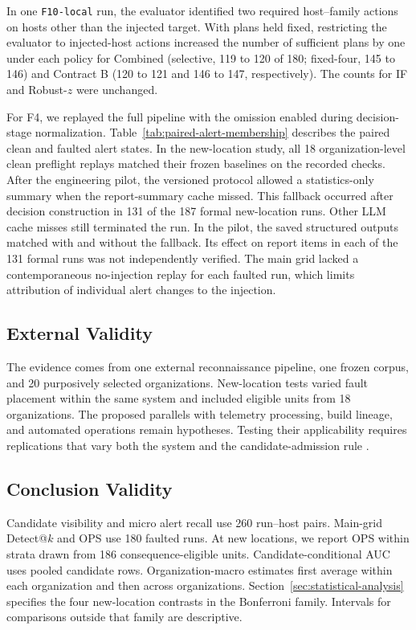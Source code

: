 \documentclass[sn-basic]{sn-jnl}%
\theoremstyle{thmstyleone}%
\theoremstyle{thmstyletwo}%
\theoremstyle{thmstylethree}%
\begin{document}
In one \texttt{F10-local} run, the evaluator identified two required host--family actions on hosts other than the injected target. With plans held fixed, restricting the evaluator to injected-host actions increased the number of sufficient plans by one under each policy for Combined (selective, 119 to 120 of 180; fixed-four, 145 to 146) and Contract B (120 to 121 and 146 to 147, respectively). The counts for IF and Robust-\(z\) were unchanged.

For F4, we replayed the full pipeline with the omission enabled during decision-stage normalization. Table~\ref{tab:paired-alert-membership} describes the paired clean and faulted alert states. In the new-location study, all 18 organization-level clean preflight replays matched their frozen baselines on the recorded checks. After the engineering pilot, the versioned protocol allowed a statistics-only summary when the report-summary cache missed. This fallback occurred after decision construction in 131 of the 187 formal new-location runs. Other LLM cache misses still terminated the run. In the pilot, the saved structured outputs matched with and without the fallback. Its effect on report items in each of the 131 formal runs was not independently verified. The main grid lacked a contemporaneous no-injection replay for each faulted run, which limits attribution of individual alert changes to the injection.

\subsection{External Validity}\label{sec:external-validity}

The evidence comes from one external reconnaissance pipeline, one frozen corpus, and 20 purposively selected organizations. New-location tests varied fault placement within the same system and included eligible units from 18 organizations. The proposed parallels with telemetry processing, build lineage, and automated operations remain hypotheses. Testing their applicability requires replications that vary both the system and the candidate-admission rule \citep{shull2008}.

\subsection{Conclusion Validity}\label{sec:conclusion-validity}

Candidate visibility and micro alert recall use 260 run--host pairs. Main-grid Detect@\(k\) and OPS use 180 faulted runs. At new locations, we report OPS within strata drawn from 186 consequence-eligible units. Candidate-conditional AUC uses pooled candidate rows. Organization-macro estimates first average within each organization and then across organizations. Section~\ref{sec:statistical-analysis} specifies the four new-location contrasts in the Bonferroni family. Intervals for comparisons outside that family are descriptive.
\end{document}
